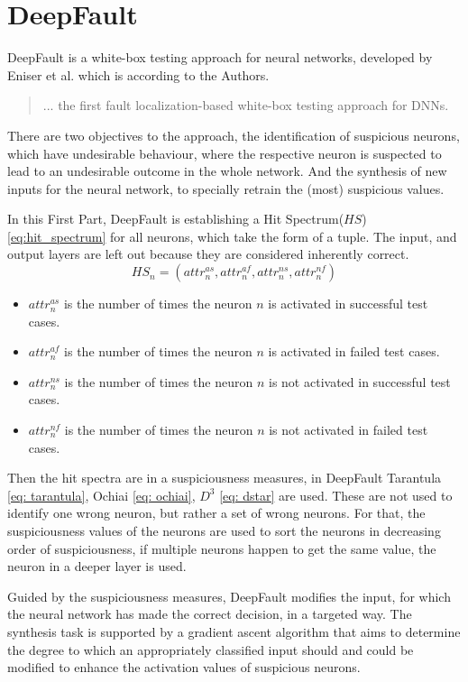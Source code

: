 \section{DeepFault}\label{sec:deepfault}
DeepFault\cite{eniser_deepfault_2019} is a white-box testing approach for neural networks, developed by Eniser et al. which is according to the Authors.
\begin{quote}
    ... the first fault localization-based white-box testing approach for DNNs.
\end{quote}
There are two objectives to the approach, the identification of suspicious neurons, which have undesirable behaviour, where the respective neuron is suspected to lead to an undesirable outcome in the whole network.
And the synthesis of new inputs for the neural network, to specially retrain the (most) suspicious values.

In this First Part, DeepFault is establishing a Hit Spectrum($HS$) \ref{eq:hit_spectrum} for all neurons, which take the form of a tuple.
The input, and output layers are left out because they are considered inherently correct.
\begin{equation}
    HS_n = (attr_n^{as}, attr_n^{af}, attr_n^{ns}, attr_n^{nf})\label{eq:hit_spectrum}
\end{equation}
\begin{itemize}
    \item $attr^{as}_n$ is the number of times the neuron $n$ is activated in successful test cases.
    \item $attr^{af}_n$ is the number of times the neuron $n$ is activated in failed test cases.
    \item $attr^{ns}_n$ is the number of times the neuron $n$ is not activated in successful test cases.
    \item $attr^{nf}_n$ is the number of times the neuron $n$ is not activated in failed test cases.
\end{itemize}
Then the hit spectra are in a suspiciousness measures, in DeepFault Tarantula \ref{eq: tarantula}, Ochiai \ref{eq: ochiai}, $D^3$ \ref{eq: dstar} are used.
These are not used to identify one wrong neuron, but rather a set of wrong neurons.
For that, the suspiciousness values of the neurons are used to sort the neurons in decreasing order of suspiciousness, if multiple neurons happen to get the same value, the neuron in a deeper layer is used.

Guided by the suspiciousness measures, DeepFault modifies the input, for which the neural network has made the correct decision, in a targeted way.
The synthesis task is supported by a gradient ascent algorithm that aims to determine the degree to which an appropriately classified input should and could be modified to enhance the activation values of suspicious neurons.